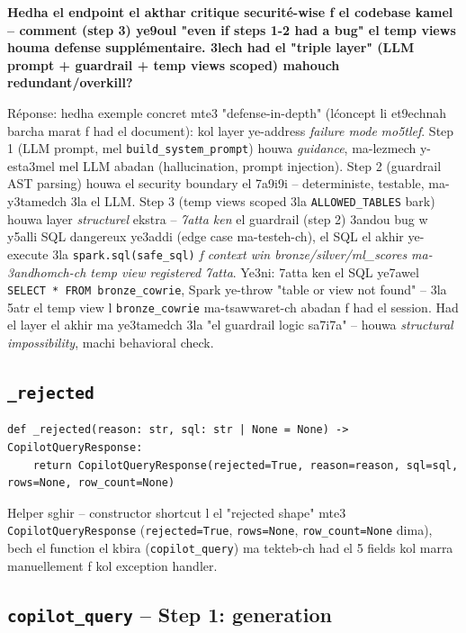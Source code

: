 \documentclass[11pt,a4paper]{report}
\DeclareRobustCommand{\code}[1]{\texttt{#1}}
\begin{document}
\begin{soual}
\textbf{Hedha el endpoint el akthar critique securité-wise f el codebase
kamel -- comment (step 3) ye9oul "even if steps 1-2 had a bug" el temp
views houma defense supplémentaire. 3lech had el "triple layer" (LLM
prompt + guardrail + temp views scoped) mahouch redundant/overkill?}

Réponse: hedha exemple concret mte3 "defense-in-depth" (l\'concept li
et9echnah barcha marat f had el document): kol layer ye-address
\emph{failure mode} \emph{mo5tlef}. Step 1 (LLM prompt, mel
\code{build\_system\_prompt}) houwa \emph{guidance}, ma-lezmech y-esta3mel
mel LLM abadan (hallucination, prompt injection). Step 2 (guardrail
AST parsing) houwa el security boundary el 7a9i9i -- deterministe,
testable, ma-y3tamedch 3la el LLM. Step 3 (temp views scoped 3la
\code{ALLOWED\_TABLES} bark) houwa layer \emph{structurel} ekstra --
\emph{7atta ken} el guardrail (step 2) 3andou bug w y5alli SQL dangereux
ye3addi (edge case ma-testeh-ch), el SQL el akhir ye-execute 3la
\code{spark.sql(safe\_sql)} \emph{f context win bronze/silver/ml\_scores
ma-3andhomch-ch temp view registered 7atta}. Ye3ni: 7atta ken el SQL
ye7awel \code{SELECT * FROM bronze\_cowrie}, Spark ye-throw
"table or view not found" -- 3la 5atr el temp view l \code{bronze\_cowrie}
ma-tsawwaret-ch abadan f had el session. Had el layer el akhir ma
ye3tamedch 3la "el guardrail logic sa7i7a" -- houwa \emph{structural
impossibility}, machi behavioral check.
\end{soual}

\subsection{\code{\_rejected}}

\begin{lstlisting}[style=pystyle]
def _rejected(reason: str, sql: str | None = None) -> CopilotQueryResponse:
    return CopilotQueryResponse(rejected=True, reason=reason, sql=sql, rows=None, row_count=None)
\end{lstlisting}

Helper sghir -- constructor shortcut l el "rejected shape" mte3
\code{CopilotQueryResponse} (\code{rejected=True}, \code{rows=None},
\code{row\_count=None} dima), bech el function el kbira (\code{copilot\_query})
ma tekteb-ch had el 5 fields kol marra manuellement f kol exception
handler.

\subsection{\code{copilot\_query} -- Step 1: generation}
\end{document}
